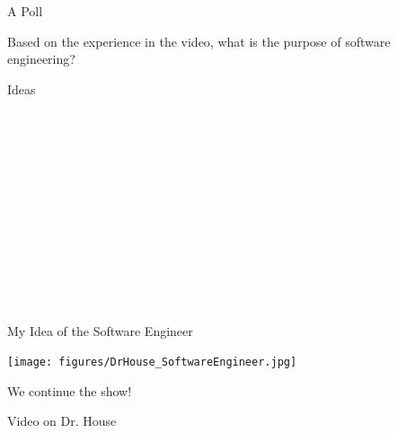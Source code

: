\documentclass{beamer}
\begin{document}
\begin{frame}{\centerline{A Poll}}
\begin{center}
Based on the experience in the video, what is the purpose of software engineering?
\end{center}
\end{frame}

\begin{frame}{\centerline{Ideas}}
\noindent\makebox[\linewidth]{\rule{\paperwidth}{0.4pt}}\\
\vspace{0.5cm}

\noindent\makebox[\linewidth]{\rule{\paperwidth}{0.4pt}}\\
\vspace{0.5cm}

\noindent\makebox[\linewidth]{\rule{\paperwidth}{0.4pt}}\\
\vspace{0.5cm}

\noindent\makebox[\linewidth]{\rule{\paperwidth}{0.4pt}}\\
\vspace{0.5cm}

\noindent\makebox[\linewidth]{\rule{\paperwidth}{0.4pt}}\\
\vspace{0.5cm}

\noindent\makebox[\linewidth]{\rule{\paperwidth}{0.4pt}}\\
\vspace{0.5cm}

\noindent\makebox[\linewidth]{\rule{\paperwidth}{0.4pt}}\\

\end{frame}

\begin{frame}{\centerline{My Idea of the Software Engineer}}

\begin{center}
\texttt{[image: figures/DrHouse\_SoftwareEngineer.jpg]}
\end{center}

\end{frame}

\begin{frame}{\centerline{We continue the show!}}
\vspace*{1.5cm}
\begin{center}
\Huge Video on Dr. House

\end{center}

\end{frame}
\end{document}
